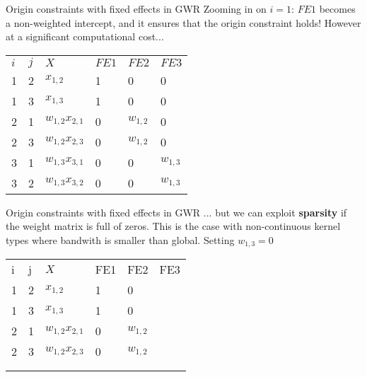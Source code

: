 \documentclass[final, 12pt, aspectratio=169, xcolor={dvipsnames}]{beamer}
\begin{document}
\begin{frame}{Origin constraints with fixed effects in GWR}
  Zooming in on $i=1$: $FE1$ becomes a non-weighted intercept, and it ensures that the origin constraint holds! However at a significant computational cost...
  \begin{table}
    \begin{tabular}{llllll}
      $i$ & $j$ &  $X$ & $FE1$ & $FE2$ & $FE3$ \\
      1 & 2 &  $x_{1,2}$ & 1 & 0 & 0 \\
      1 & 3 &  $x_{1,3}$ & 1 & 0 & 0 \\
      2 & 1 &  $w_{1,2}x_{2,1}$ & 0 & $w_{1,2}$ & 0 \\
      2 & 3 &  $w_{1,2}x_{2,3}$ & 0 & $w_{1,2}$ & 0 \\
      3 & 1 &  $w_{1,3}x_{3,1}$ & 0 & 0 & $w_{1,3}$ \\
      3 & 2 &  $w_{1,3}x_{3,2}$ & 0 & 0 & $w_{1,3}$ \\
      \end{tabular}
  \end{table}
  
\end{frame}

\begin{frame}{Origin constraints with fixed effects in GWR}
  ... but we can exploit \textbf{sparsity} if the weight matrix is full of zeros. This is the case with non-continuous kernel types where bandwith is smaller than global. Setting $w_{1,3} = 0$  
  \begin{table}
    \begin{tabular}{llllll}
      i & j &  $X$ & FE1 & FE2 & FE3 \\
      1 & 2 &  $x_{1,2}$ & 1 & 0 & \color{gray}{0} \\
      1 & 3 &  $x_{1,3}$ & 1 & 0 & \color{gray}{0} \\
      2 & 1 &  $w_{1,2}x_{2,1}$ & 0 & $w_{1,2}$ & \color{gray}{0} \\
      2 & 3 &  $w_{1,2}x_{2,3}$ & 0 & $w_{1,2}$ & \color{gray}{0} \\
      \color{gray}{3} & \color{gray}{1} &  \color{gray}{$w_{1,3}x_{3,1}$} & \color{gray}{0} & \color{gray}{0} & \color{gray}{$w_{1,3}$} \\
        \color{gray}{3} & \color{gray}{2} &  \color{gray}{$w_{1,3}x_{3,2}$} & \color{gray}{0} & \color{gray}{0} & \color{gray}{$w_{1,3}$} \\
      \end{tabular}
  \end{table}  
\end{frame}
\end{document}
